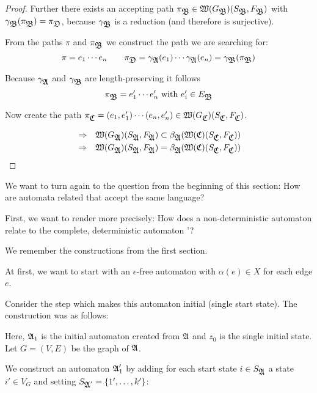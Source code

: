 \begin{proof}
Further there exists an accepting path $\pi_{\mbox{$\mathfrak{B}$}} \in
\mbox{$\mathfrak{W}({G_{\mbox{$\mathfrak{B}$}}})$}(S_{\mbox{$\mathfrak{B}$}}, F_{\mbox{$\mathfrak{B}$}})$ with
$\gamma_{\mbox{$\mathfrak{B}$}}(\pi_{\mbox{$\mathfrak{B}$}}) = \pi_{\mbox{$\mathfrak{D}$}}$, because $\gamma_{\mbox{$\mathfrak{B}$}}$ is a
reduction (and therefore is surjective).

From the paths $\pi$ and $\pi_{\mbox{$\mathfrak{B}$}}$ we construct the path we are searching
for:
\[ \pi = e_1 \cdots e_n \qquad \pi_{\mbox{$\mathfrak{D}$}} = \gamma_{\mbox{$\mathfrak{A}$}}(e_1) \cdots
\gamma_{\mbox{$\mathfrak{A}$}}(e_n) = \gamma_{\mbox{$\mathfrak{B}$}}(\pi_{\mbox{$\mathfrak{B}$}}) \]

Because $\gamma_{\mbox{$\mathfrak{A}$}}$ and $\gamma_{\mbox{$\mathfrak{B}$}}$ are length-preserving it follows
\[ \pi_{\mbox{$\mathfrak{B}$}} = e'_1 \cdots e'_n \text{ with }e'_i \in E_{\mbox{$\mathfrak{B}$}} \]

Now create the path $\pi_{\mbox{$\mathfrak{C}$}} = (e_1, e'_1) \cdots (e_n, e'_n) \in
\mbox{$\mathfrak{W}({G_{\mbox{$\mathfrak{C}$}}})$}(S_{\mbox{$\mathfrak{C}$}}, F_{\mbox{$\mathfrak{C}$}})$.

\begin{eqnarray*}
& \Rightarrow & \mbox{$\mathfrak{W}({G_{\mbox{$\mathfrak{A}$}}})$}(S_{\mbox{$\mathfrak{A}$}}, F_{\mbox{$\mathfrak{A}$}}) \subset
\beta_{\mbox{$\mathfrak{A}$}}(\mbox{$\mathfrak{W}({\mbox{$\mathfrak{C}$}})$}(S_{\mbox{$\mathfrak{C}$}}, F_{\mbox{$\mathfrak{C}$}})) \\
& \Rightarrow & \mbox{$\mathfrak{W}({G_{\mbox{$\mathfrak{A}$}}})$}(S_{\mbox{$\mathfrak{A}$}}, F_{\mbox{$\mathfrak{A}$}}) =
\beta_{\mbox{$\mathfrak{A}$}}(\mbox{$\mathfrak{W}({\mbox{$\mathfrak{C}$}})$}(S_{\mbox{$\mathfrak{C}$}}, F_{\mbox{$\mathfrak{C}$}}))
\end{eqnarray*}
\end{proof}

\bigskip
We want to turn again to the question from the beginning of this section: How
are automata related that accept the same language?

First, we want to render more precisely: How does a non-deterministic automaton
 relate to the complete, deterministic automaton '?

We remember the constructions from the first section.

At first, we want to start with an $\epsilon$-free automaton with $\alpha(e)
\in X$ for each edge $e$.

Consider the step which makes this automaton initial (single start state). The
construction was as follows:

\begin{center}

\end{center}

Here, $\mbox{$\mathfrak{A}$}_1$ is the initial automaton created from $\mbox{$\mathfrak{A}$}$ and $z_0$ is the
single initial state. Let $G = (V, E)$ be the graph of $\mbox{$\mathfrak{A}$}$.

We construct an automaton $\mbox{$\mathfrak{A}$}'_1$ by adding for each start state $i \in
S_{\mbox{$\mathfrak{A}$}}$ a state $i' \in V_G$ and setting $S_{\mbox{$\mathfrak{A}$}'} = \mbox{$\{1', \ldots,
k'\}$}$:


